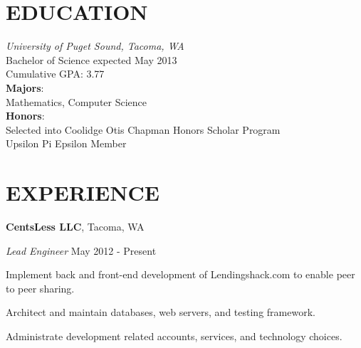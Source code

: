\documentclass[line,margin]{res}
\newenvironment{itemize*}%
  {\begin{itemize}%
    \setlength{\parsep}{0pt}
    \setlength{\itemsep}{0pt}%
    \setlength{\parskip}{0pt}}%
  {\end{itemize}}
\begin{document}
\address{2214 N. Washington Street, Tacoma, WA 98406}
\address{kwenholz@pugetsound.edu\hspace*{2mm} \vline \hspace*{2mm} (406)546-9210}


\begin{resume}
\vspace*{.3cm}

\section{EDUCATION} {\sl University of Puget Sound, Tacoma, WA} \\
                Bachelor of Science
                expected May 2013 \\
                Cumulative GPA: 3.77\\
                \textbf{Majors}: \\
\hspace*{5mm}                Mathematics, Computer Science \\
                \textbf{Honors}:\\
\hspace*{5mm}   Selected into Coolidge Otis Chapman Honors Scholar Program\\
\hspace*{5mm}   Upsilon Pi Epsilon Member\\

\vspace*{.2cm}

\section{EXPERIENCE}

\textbf{CentsLess LLC}, Tacoma, WA

{\sl Lead Engineer} \hfill May 2012 - Present
\begin{itemize*}
    \item Implement back and front-end development of Lendingshack.com
        to enable peer to peer sharing.
    \item Architect and maintain databases, web servers, and testing framework.
    \item Administrate development related accounts, services, and technology
        choices.
\end{itemize*}


\end{resume}
\end{document}
